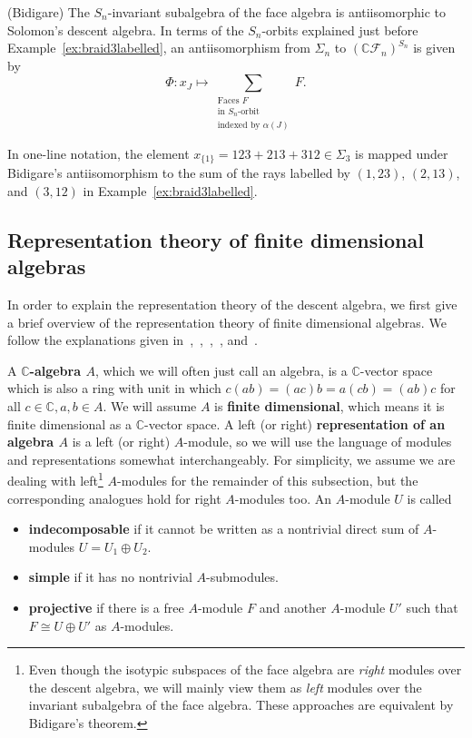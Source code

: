 \documentclass[ALCO, Unicode]{cedram}
\def\C{{\mathbb{C}}}
\begin{document}
\begin{thm}(Bidigare)\label{thm:bidigare}
The $S_n$-invariant subalgebra of the face algebra is antiisomorphic to Solomon's descent algebra.  In terms of the $S_n$-orbits explained just before Example~\ref{ex:braid3labelled}, an antiisomorphism from $\Sigma_n$ to $\left(\C \mathcal{F}_n\right)^{S_n}$ is given by \[\Phi:x_J \mapsto \sum_{\substack{\text{Faces }F\\ \text{in $S_n$-orbit }\\ \text{indexed by } \alpha(J)}}F.\] 
\end{thm}

\begin{exam}
     In one-line notation, the element $x_{\{1\}} = 123 + 213 + 312 \in \Sigma_3$ is mapped under Bidigare's antiisomorphism to the sum of the rays labelled by $(1, 23)$, $(2, 13)$, and $(3, 12)$ in Example~\ref{ex:braid3labelled}.
\end{exam}


\subsection{Representation theory of finite dimensional algebras}\label{subsec:rep-theory-fin-dim-algebras} In order to explain the representation theory of the descent algebra, we first give a brief overview of the representation theory of finite dimensional algebras. We follow the explanations given in~\cite[Appendix $D$]{Aguiar-Mahajan},~\cite[Ch. 1]{assem},~\cite[Ch. 9]{etingof},~\cite[\S 4.2]{MSS}, and~\cite[Ch. 6, 7]{webbrepntheory}.

 A \textbf{$\C$-algebra $A$}, which we will often just call an algebra, is a $\C$-vector space which is also a ring with unit in which $c(ab) = (ac)b = a(cb) = (ab) c$ for all $c \in \C, a, b \in A.$ We will assume $A$ is \textbf{finite dimensional}, which means it is finite dimensional as a $\C$-vector space. A left (or right) \textbf{representation of an algebra $A$} is a left (or right) $A$-module, so we will use the language of modules and representations somewhat interchangeably. For simplicity, we assume we are dealing with {left}\footnote{Even though the isotypic subspaces of the face algebra are \textit{right} modules over the descent algebra, we will mainly view them as \textit{left} modules over the invariant subalgebra of the face algebra. These approaches are equivalent by Bidigare's theorem.} $A$-modules for the remainder of this subsection, but the corresponding analogues hold for right $A$-modules too. An $A$-module $U$ is called
\begin{itemize}
    \item \textbf{indecomposable} if it cannot be written as a nontrivial direct sum of $A$-modules $U = U_1 \oplus U_2.$ 
    \item \textbf{simple} if it has no nontrivial $A$-submodules. 
    \item \textbf{projective} if there is a free $A$-module $F$ and another $A$-module $U'$ such that $F \cong U \oplus U'$ as $A$-modules.
\end{itemize}
\end{document}
